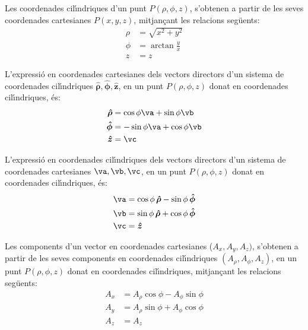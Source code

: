 \documentclass[catalan,a4paper,twoside,11pt]{article}
\begin{document}
Les coordenades  cil\'{\i}ndriques  d'un punt $P(\rho,\phi,z)$,
s'obtenen a partir de les seves coordenades cartesianes $P(x,y,z)$,
mitjan\c{c}ant les relacions seg\"{u}ents:
\begin{subequations}\begin{align}
    \rho &= \sqrt{x^2+y^2}\\
    \phi &=  \arctan\frac{y}{x}\\
    z &= z
\end{align}\end{subequations}

L'expressi\'{o} en coordenades cartesianes dels vectors directors d'un sistema de coordenades  cil\'{\i}ndriques $\boldsymbol{\hat{\rho}},\boldsymbol{\hat{\phi}},\boldsymbol{\hat{z}}$, en un punt $P(\rho,\phi,z)$ donat en coordenades cil\'{\i}ndriques, \'{e}s:
\begin{subequations}\begin{align}
    \boldsymbol{\hat{\rho}} &=\cos\phi\va+\sin\phi\vb \\
    \boldsymbol{\hat{\phi}} &=-\sin\phi\va+\cos\phi\vb \\
    \boldsymbol{\hat{z}} &=\vc
\end{align}\end{subequations}

L'expressi\'{o} en coordenades cil\'{\i}ndriques dels vectors directors d'un sistema de coordenades  cartesianes $\va,\vb,\vc$, en un punt $P(\rho,\phi,z)$ donat en coordenades cil\'{\i}ndriques, \'{e}s:
\begin{subequations}\begin{align}
    \va &=\cos\phi\,\boldsymbol{\hat{\rho}}-\sin\phi\,\boldsymbol{\hat{\phi}} \\
    \vb &=\sin\phi\,\boldsymbol{\hat{\rho}}+\cos\phi\,\boldsymbol{\hat{\phi}} \\
    \vc &=\boldsymbol{\hat{z}}
\end{align}\end{subequations}

Les components d'un vector en coordenades cartesianes ($A_x, A_y, A_z)$, s'obtenen a partir de les seves components en coordenades cil\'{\i}ndriques $(A_\rho, A_\phi, A_z)$, en un punt $P(\rho,\phi,z)$ donat en coordenades cil\'{\i}ndriques, mitjan\c{c}ant les relacions seg\"{u}ents:
\begin{subequations}\begin{align}
    A_x &=A_\rho \cos\phi -A_\phi\sin\phi \\
    A_y &=A_\rho\sin\phi +A_\phi\cos\phi\\
    A_z &= A_z
\end{align}\end{subequations}
\end{document}
